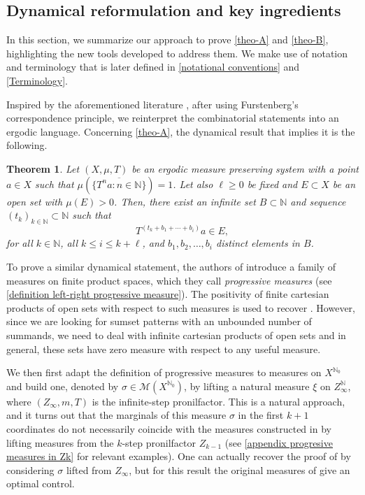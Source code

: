 \documentclass[letter, 11pt]{article}
\newtheorem{theo}{Theorem}[section]
\theoremstyle{definition}
\theoremstyle{plain}
\newcommand{\N}{\mathbb{N}}
\newcommand{\cM}{\mathcal{M}}
\newcommand{\1}{\mathbbm{1}}
\begin{document}
\subsection{Dynamical reformulation and key ingredients} \label{sec outline of main argument}

In this section, we summarize our approach to prove \cref{theo-A} and \cref{theo-B}, highlighting the new tools developed to address them. We make use of notation and terminology that is later defined in \cref{notational conventions} and \cref{Terminology}.

 Inspired by the aforementioned literature \cite{hernandez2025infinite,host2019short,Kra_Moreira_Richter_Robertson:2023,Kra_Moreira_Richter_Robertson:2022,kmrr25}, after using Furstenberg's correspondence principle, we reinterpret the combinatorial statements into an ergodic language. 
Concerning \cref{theo-A}, the dynamical result that implies it is the following. 

\begin{theo}\label{dynamical reform A}
Let $(X,\mu,T)$ be an ergodic measure preserving system with a point $a\in X$ such that $\mu\left(\overline{\{T^na: n\in \N\}}\right)=1$. Let also $\ell \geq 0$ be fixed and $E\subset X$ be an open set with $\mu(E)>0$. Then, there exist an infinite set $B \subset \N$ and sequence $(t_k)_{k\in \N} \subset \N$ such that 
\begin{equation} \label{eq rec for block equation}
    T^{\left(t_k+ b_{1}+\cdots + b_{i}\right)}a \in E,
\end{equation}
for all $k\in \N$, all $k\leq i \leq k+\ell$, and $b_1, b_2, \ldots, b_i $ distinct elements in $B$.
\end{theo}
To prove a similar dynamical statement, the authors of \cite{kmrr25} introduce a family of measures on finite product spaces, which they call \emph{progressive measures} (see \cref{definition left-right progressive measure}). The positivity of finite cartesian products of open sets with respect to such measures is used to recover . However, since we are looking for sumset patterns with an unbounded number of summands, we need to deal with infinite cartesian products of open sets and in general, these sets have zero measure with respect to any useful measure. 

We then first adapt the definition of 
progressive measures to measures on $X^{\N_0}$ and build one, denoted by $\sigma \in \cM(X^{\N_0})$, by lifting a natural measure $\xi$ on $Z^{\N}_{\infty}$, where $(Z_{\infty},m,T)$ is the infinite-step pronilfactor. This is a natural approach, and it turns out that the marginals
of this measure $\sigma$ in the first $k+1$ coordinates do not necessarily coincide with the measures constructed in \cite{kmrr25} by lifting measures from the $k$-step pronilfactor $Z_{k-1}$ (see \cref{appendix progresive measures in Zk} for relevant examples). 
One can actually recover the proof of  by considering $\sigma$ lifted from $Z_{\infty}$, but for this result the original measures of \cite{kmrr25} give an optimal control. 
\end{document}
